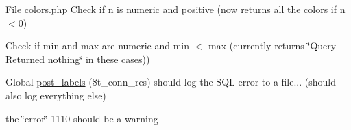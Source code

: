 
\begin{DoxyRefList}
\item[File \mbox{\hyperlink{colors_8php}{colors.php}} ]\label{todo__todo000001}%
%
Check if n is numeric and positive (now returns all the colors if n$<$0) 

Check if min and max are numeric and min $<$ max (currently returns \char`\"{}\+Query Returned nothing\char`\"{} in these cases))  
\item[Global \mbox{\hyperlink{planlabels_8php_a63da149e1c19489a63a10defc5a47ef7}{post\+\_\+labels}} (\$t\+\_\+conn\+\_\+res)]\label{todo__todo000003}%
%
should log the S\+QL error to a file... (should also log everything else) 

the \char`\"{}error\char`\"{} 1110 should be a warning 
\end{DoxyRefList}